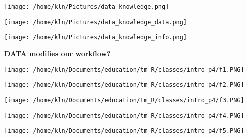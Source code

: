 \documentclass[8pt]{beamer}
\begin{document}
\begin{frame}{}%
	\begin{center}
		\texttt{[image: /home/kln/Pictures/data\_knowledge.png]}
	\end{center}
\end{frame}
\begin{frame}{}
	\begin{center}
		\texttt{[image: /home/kln/Pictures/data\_knowledge\_data.png]}
	\end{center}
\end{frame}
\begin{frame}{}
	\begin{center}
		\texttt{[image: /home/kln/Pictures/data\_knowledge\_info.png]}
	\end{center}
\end{frame}
\begin{frame}
	\begin{center}
		\textbf{DATA modifies our workflow?}
	\end{center}
\end{frame}
\begin{frame}
	\begin{center}
		\texttt{[image: /home/kln/Documents/education/tm\_R/classes/intro\_p4/f1.PNG]}
	\end{center}
\end{frame}
\begin{frame}
	\begin{center}
		\texttt{[image: /home/kln/Documents/education/tm\_R/classes/intro\_p4/f2.PNG]}
	\end{center}
\end{frame}
\begin{frame}
	\begin{center}
		\texttt{[image: /home/kln/Documents/education/tm\_R/classes/intro\_p4/f3.PNG]}
	\end{center}
\end{frame}
\begin{frame}
	\begin{center}
		\texttt{[image: /home/kln/Documents/education/tm\_R/classes/intro\_p4/f4.PNG]}
	\end{center}
\end{frame}
\begin{frame}
	\begin{center}
		\texttt{[image: /home/kln/Documents/education/tm\_R/classes/intro\_p4/f5.PNG]}
	\end{center}
\end{frame}
\end{document}
